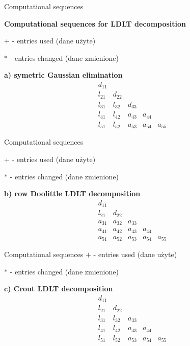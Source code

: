 \begin{frame}{Computational sequences}

\textbf{Computational sequences for LDLT decomposition}

$+$ - entries used (dane użyte)

$*$ - entries changed (dane zmienione)

\textbf{a) symetric Gaussian elimination}
$$
\begin{array}{lllll}

d_{11} \\
l_{21} & d_{22}\\
l_{31} & l_{32} & d_{33}\\
l_{41} & l_{42} & a_{43} & a_{44}\\
l_{51} & l_{52} & a_{53} & a_{54} & a_{55}

\end{array}
$$

\end{frame}
\begin{frame}{Computational sequences}

$+$ - entries used (dane użyte)

$*$ - entries changed (dane zmienione)

\textbf{b) row Doolittle LDLT decomposition}
$$
\begin{array}{lllll}
d_{11} \\
l_{21} & d_{22} \\
a_{31} & a_{32} & a_{33}\\
a_{41} & a_{42} & a_{43} & a_{44} \\
a_{51} & a_{52} & a_{53} & a_{54} & a_{55}
\end{array}
$$

\end{frame} 
\begin{frame}{Computational sequences}
$+$ - entries used (dane użyte)

$*$ - entries changed (dane zmienione)

\textbf{c) Crout LDLT decomposition}
$$
\begin{array}{lllll}
d_{11}\\
l_{21} & d_{22}\\
l_{31} & l_{32} & a_{33}\\
l_{41} & l_{42} & a_{43} & a_{44} \\
l_{51} & l_{52} & a_{53} & a_{54} &  a_{55}
\end{array}
$$
\end{frame}
